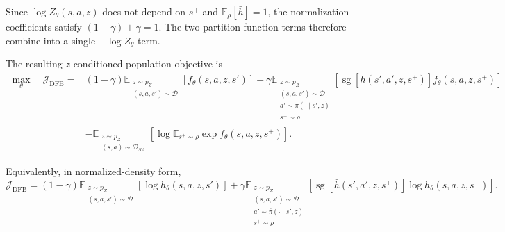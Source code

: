 \documentclass[11pt]{article}
\newcommand{\sg}{\operatorname{sg}}
\begin{document}
Since $\log Z_\theta(s,a,z)$ does not depend on $s^+$ and $\mathbb E_\rho[\bar h]=1$, the normalization coefficients satisfy $(1-\gamma)+\gamma=1$. The two partition-function terms therefore combine into a single $-\log Z_\theta$ term.

The resulting $z$-conditioned population objective is
\begin{equation}
\boxed{
\begin{aligned}
    \max_\theta\quad\mathcal J_{\mathrm{DFB}} ={}& (1-\gamma)\mathbb E_{\substack{z\sim p_Z\\(s,a,s')\sim\mathcal D}}\left[f_\theta(s,a,z,s')\right] + \gamma\mathbb
                                                    E_{\substack{z\sim p_Z\\(s,a,s')\sim\mathcal D\\a'\sim\bar\pi(\cdot\mid s',z)\\s^+\sim\rho}}\left[\sg\!\left[\bar h(s',a',z,s^+)\right]f_\theta(s,a,z,s^+)\right] \\
                                                &   - \mathbb E_{\substack{z\sim p_Z\\(s,a)\sim\mathcal D_{SA}}}\left[\log\mathbb E_{s^+\sim\rho}\exp f_\theta(s,a,z,s^+)\right].
\end{aligned}
}
\label{eq:dfb-final}
\end{equation}

Equivalently, in normalized-density form,
\[
    \mathcal J_{\mathrm{DFB}} = (1-\gamma)\mathbb E_{\substack{z\sim p_Z\\(s,a,s')\sim\mathcal D}}\left[\log h_\theta(s,a,z,s')\right] + \gamma\mathbb E_{\substack{z\sim p_Z\\(s,a,s')\sim\mathcal D\\a'\sim\bar\pi(\cdot\mid s',z)\\s^+\sim\rho}}\left[\sg\!\left[\bar h(s',a',z,s^+)\right]\log h_\theta(s,a,z,s^+)\right].
\]
\end{document}
